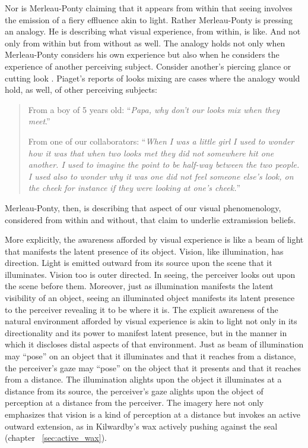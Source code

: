 Nor is Merleau-Ponty claiming that it appears from within that seeing involves the emission of a fiery effluence akin to light. Rather Merleau-Ponty is pressing an analogy. He is describing what visual experience, from within, is like. And not only from within but from without as well. The analogy holds not only when Merleau-Ponty considers his own experience but also when he considers the experience of another perceiving subject. Consider another's piercing glance or cutting look \citep[140]{Winer:1996as}. Piaget's reports of looks mixing are cases where the analogy would hold, as well, of other perceiving subjects: 
\begin{quotation}
	From a boy of 5 years old: ``\emph{Papa, why don't our looks mix when they meet}.''
	
	From one of our collaborators: ``\emph{When I was a little girl I used to wonder how it was that when two looks met they did not somewhere hit one another. I used to imagine the point to be half-way between the two people. I used also to wonder why it was one did not feel someone else's look, on the cheek for instance if they were looking at one's cheek.}'' \citep[48]{Piaget:1929dp}
\end{quotation}
Merleau-Ponty, then, is describing that aspect of our visual phenomenology, considered from within and without, that \citet{Winer:1996as} claim to underlie extramission beliefs. 

More explicitly, the awareness afforded by visual experience is like a beam of light that manifests the latent presence of its object. Vision, like illumination, has direction. Light is emitted outward from its source upon the scene that it illuminates.  Vision too is outer directed. In seeing, the perceiver looks out upon the scene before them. Moreover, just as illumination manifests the latent visibility of an object, seeing an illuminated object manifests its latent presence to the perceiver revealing it to be where it is. The explicit awareness of the natural environment afforded by visual experience is akin to light not only in its directionality and its power to manifest latent presence, but in the manner in which it discloses distal aspects of that environment. Just as beam of illumination may ``pose'' on an object that it illuminates and that it reaches from a distance, the perceiver's gaze may ``pose'' on the object that it presents and that it reaches from a distance. The illumination alights upon the object it illuminates at a distance from its source, the perceiver's gaze alights upon the object of perception at a distance from the perceiver. The imagery here not only emphasizes that vision is a kind of perception at a distance but invokes an active outward extension, as in Kilwardby's wax actively pushing against the seal (chapter ~\ref{sec:active_wax}).

